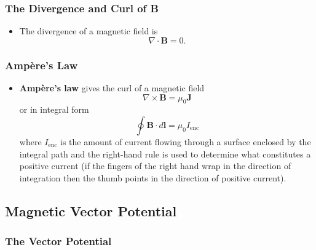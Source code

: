 \documentclass{article}
\renewcommand{\vec}[1]{\boldsymbol{\mathbf{#1}}}
\begin{document}
\setcounter{subsubsection}{1}
\subsubsection{The Divergence and Curl of B}

\begin{itemize}
  \item The divergence of a magnetic field is \[\nabla \cdot \vec{B} = 0.\]
\end{itemize}

\subsubsection{Ampère's Law}

\begin{itemize}
  \item \textbf{Ampère's law} gives the curl of a magnetic field \[\nabla \times \vec{B} = \mu_0 \vec{J}\] or in integral form \[\oint \vec{B} \cdot d \vec{l} = \mu_0 I_\text{enc}\] where $I_\text{enc}$ is the amount of current flowing through a surface enclosed by the integral path and the right-hand rule is used to determine what constitutes a positive current (if the fingers of the right hand wrap in the direction of integration then the thumb points in the direction of positive current).
\end{itemize}

\subsection{Magnetic Vector Potential}

\subsubsection{The Vector Potential}
\end{document}
